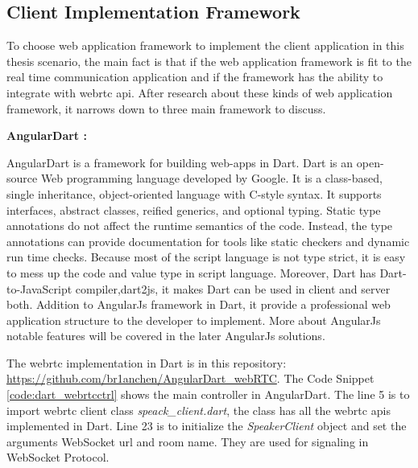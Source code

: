 \subsection{Client Implementation Framework}

\noindent To choose web application framework to implement the client application in this thesis scenario, the main fact is that if the web  application framework is fit to the real time communication application and if the framework has the ability to integrate with \gls{webrtc} \gls{api}. After research about these kinds of web application framework, it narrows down to three main framework to discuss.

\textbf{AngularDart :}

\par AngularDart is a framework for building web-apps in Dart. Dart is an open-source Web programming language developed by Google. It is a class-based, single inheritance, object-oriented language with C-style syntax. It supports interfaces, abstract classes, reified generics, and optional typing. Static type annotations do not affect the runtime semantics of the code. Instead, the type annotations can provide documentation for tools like static checkers and dynamic run time checks.\cite{wiki:dart} Because most of the script language is not type strict, it is easy to mess up the code and value type in script language. Moreover, Dart has Dart-to-JavaScript compiler,dart2js, it makes Dart can be used in client and server both. Addition to AngularJs framework in Dart, it provide a professional web application structure to the developer to implement. More about AngularJs notable features will be covered in the later AngularJs solutions. 

\par The \gls{webrtc} implementation in Dart is in this repository: \url{https://github.com/br1anchen/AngularDart_webRTC}. The Code Snippet \ref{code:dart_webrtcctrl} shows the main controller in AngularDart. The line 5 is to import \gls{webrtc} client class \textit{speack\_client.dart}, the class has all the \gls{webrtc} \gls{api}s implemented in Dart. Line 23 is to initialize the \textit{SpeakerClient} object and set the arguments WebSocket url and room name. They are used for signaling in WebSocket Protocol.

